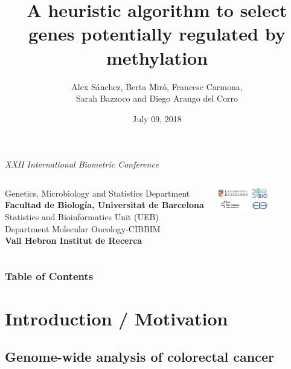 \documentclass[handout]{beamer}
\title[L-Shape Selection]{A heuristic algorithm to select genes potentially regulated by methylation}
\author[Alex S\'anchez]{Alex S\'anchez, Berta Mir\'o, Francesc Carmona, \\
	Sarah Bazzoco and Diego Arango del Corro}
\date[]{July 09, 2018}
\begin{document}
\begin{frame}
	
\begin{scriptsize}
\begin{center}
  \emph{ XXII International Biometric Conference}
\end{center}
\end{scriptsize}

\titlepage

\begin{columns}
   \scriptsize
   Genetics, Microbiology and Statistics Department \\ 
   \textbf{Facultad de Biología, Universitat de Barcelona}\\
   Statistics and Bioinformatics Unit (UEB)\\
   Department Molecular Oncology-CIBBIM \\ 
   \textbf{Vall Hebron Institut de Recerca}

  \hfill{}
  \includegraphics[height=1cm]{images/alllogos.png}
\end{columns}

\end{frame}


\begin{frame}
\frametitle{Table of Contents}
\tableofcontents
\end{frame}

\section{Introduction / Motivation}

\subsection{Genome-wide analysis of colorectal cancer}
\end{document}
